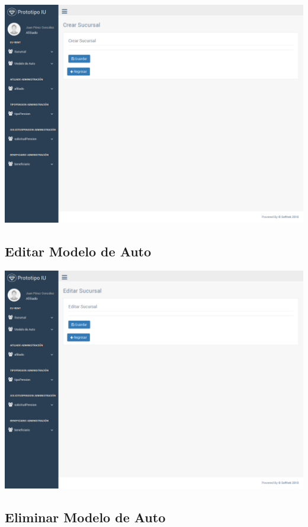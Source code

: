 \includegraphics[width=\linewidth]{ui-prototype/SucursalServices/CrearSucursalPage.png}

\subsection{Editar Modelo de Auto}

\includegraphics[width=\linewidth]{ui-prototype/SucursalServices/EditarSucursalPage.png}

\subsection{Eliminar Modelo de Auto}

